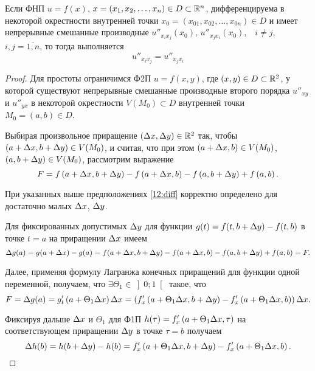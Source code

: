 \documentclass[../../main.tex]{subfiles}
\begin{document}
	\begin{thm}
		\label{secdiffeq}
		Если ФНП $u = f(x)$, $x = \left(x_1, x_2, \dots, x_n\right)\in 
		D\subset\mathbb{R}^n$, дифференцируема в некоторой окрестности внутренней 
		точки $x_0 = \left(x_{01}, x_{02}, \dots, x_{0n}\right)\in D$ и имеет 
		непрерывные смешанные производные $u''_{x_ix_j}(x_0)$, 
		$u''_{x_jx_i}(x_0)$,\ \ $i\ne j$,\ \ $i, j = \overline{1, n}$, то тогда  выполняется
		\begin{equation}
			u''_{x_ix_j} = u''_{x_jx_i}
			\label{11:diff}
		\end{equation}
	\end{thm}

	\begin{proof}
		Для простоты ограничимся Ф2П $u=f(x,y)$, где $(x,y)\in D\subset\mathbb{R}^2$, 
		у которой существуют непрерывные смешанные производные второго порядка 
		$u''_{xy}$ и $u''_{yx}$ в некоторой окрестности $V\left(M_0\right)
		\subset D$ внутренней точки $M_0 = (a,b)\in D$.
		
		Выбирая произвольное приращение $\left(\Delta x, \Delta y\right)\in\mathbb{R}^2$ 
		так, чтобы $\left(a + \Delta x, b + \Delta y\right)\in V(M_0)$, и считая, 
		что при этом $\left(a + \Delta x, b\right)\in V(M_0)$, 
		$\left(a, b + \Delta y\right)\in V(M_0)$, рассмотрим выражение
		\begin{equation}
			F=f\left(a + \Delta x, b + \Delta y\right) - f\left(a + \Delta x, b\right) - 
			f\left(a, b + \Delta y\right) + f\left(a, b\right).
			\label{12:diff}
		\end{equation}
		
		При указанных выше предположениях \eqref{12:diff} корректно определено 
		для достаточно малых $\Delta x$, $\Delta y$.
		
		Для фиксированных допустимых $\Delta y$ для функции $g(t)=f(t, b + \Delta y) - 
		f(t, b)$
		в точке $t=a$ на приращении $\Delta x$ имеем
		\[\Delta g(a)=g(a + \Delta x) - g(a) = f(a + \Delta x, b + \Delta y) - f(a + \Delta x, b) - 
		f(a, b + \Delta y) + f(a, b) = F.\]
		
		Далее, применяя формулу Лагранжа конечных приращений для функции 
		одной переменной, получаем, что $\exists\Theta_1\in\left]0;1\right[$ 
		такое, что
		\begin{equation}
			F = \Delta g(a) = g'_t\left(a + \Theta_1\Delta x\right)\Delta x = 
			\left(f'_x\left(a + \Theta_1\Delta x, b + \Delta y\right) - 
			f'_x\left(a + \Theta_1\Delta x, b\right)\right)\Delta x.
			\label{13:diff}
		\end{equation}
		
		Фиксируя дальше $\Delta x$ и $\Theta_1$ для Ф1П $h(\tau) = 
		f'_x\left(a+\Theta_1\Delta x, \tau\right)$ на соответствующем приращении 
		$\Delta y$ в точке $\tau = b$ получаем
		\begin{equation}
			\Delta h(b) = h(b + \Delta y) - h(b) = 
			f'_x\left(a + \Theta_1\Delta x, b + \Delta y\right) - 
			f'_x\left(a + \Theta_1\Delta x, b\right).
			\label{14:diff}
		\end{equation}
		

\end{proof}
\end{document}
